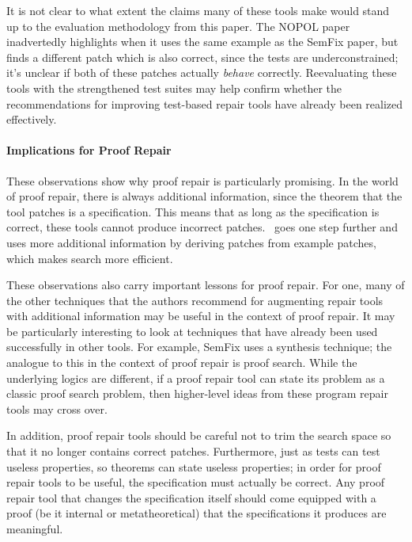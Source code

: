 It is not clear to what extent the claims many of these tools make would stand up to the evaluation methodology from this paper.
The NOPOL paper inadvertedly highlights  when it uses the same example as the SemFix paper,
but finds a different patch which is also correct, since the tests are underconstrained; it's unclear
if both of these patches actually \textit{behave} correctly. %
Reevaluating these tools with the strengthened test suites may help
confirm whether the recommendations for improving test-based repair tools have already been realized
effectively. %

\paragraph{Implications for Proof Repair}
These observations show why proof repair is particularly promising. In the world of proof repair, there is always additional information,
since the theorem that the tool patches is a specification.
This means that as long as the specification is correct, these tools cannot produce
incorrect patches. \sysname\ goes one step further and uses more additional information
by deriving patches from example patches, which makes search more efficient.

These observations also carry important lessons for proof repair.
For one, many of the other techniques that the authors recommend for augmenting repair tools with
additional information may be useful in the context of proof repair.
It may be particularly interesting to look at techniques that have already been used
successfully in other tools. For example, SemFix uses a synthesis technique;
the analogue to this in the context of proof repair is proof search. 
While the underlying logics are different, if a proof repair tool
can state its problem as a classic proof search problem, then higher-level ideas
from these program repair tools may cross over.


In addition, proof repair tools should be careful not to trim the search space so that it no
longer contains correct patches.
Furthermore, just as tests can test useless properties, so theorems can state useless properties;
in order for proof repair tools to be useful, the specification must actually be correct.
Any proof repair tool that changes the specification itself should come equipped with a proof (be it 
internal or metatheoretical) that the specifications it produces are meaningful.

